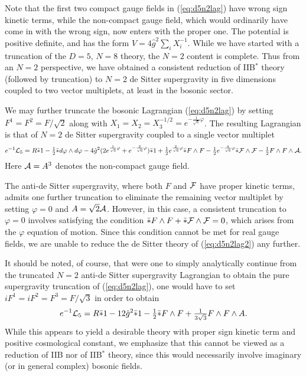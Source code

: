 \documentclass[a4paper,12pt]{article}
\newcommand{\fft}[2]{{\frac{#1}{#2}}}
\newcommand{\ft}[2]{{\textstyle\frac{#1}{#2}}}
\begin{document}
Note that the first two compact gauge fields in
(\ref{eq:d5n2lag}) have wrong sign kinetic terms, while the non-compact
gauge field, which would ordinarily have come in with the wrong sign,
now enters with the proper one.  The potential is positive definite,
and has the form $V=4\hat g^2 \sum_i{X_i^{-1}}$.  While we have
started with a truncation of the $D=5$, $N=8$ theory, the $N=2$ content
is complete.  Thus from an $N=2$ perspective, we have obtained a
consistent reduction of IIB$^*$ theory (followed by truncation) to
$N=2$ de Sitter supergravity in five dimensions coupled to two vector
multiplets, at least in the bosonic sector.

We may further truncate the bosonic Lagrangian (\ref{eq:d5n2lag}) by
setting $F^1=F^2=F/\sqrt{2}$ along with
$X_1=X_2=X_3^{-1/2}=e^{-\fft1{\sqrt{6}}\varphi}$.  The resulting
Lagrangian is that of $N=2$ de Sitter supergravity coupled to a single
vector multiplet
%
\begin{equation}
e^{-1}{\cal L}_5 = R\bar *1-\ft12\bar*d\varphi\wedge d\varphi
-4\hat g^2(2e^{\fft1{\sqrt{6}}\varphi}+e^{-\fft2{\sqrt{6}}\varphi})\bar*1
+\ft12e^{\fft2{\sqrt{6}}\varphi}\bar*F\wedge
F-\ft12e^{-\fft4{\sqrt{6}}\varphi}
\bar*{\cal F}\wedge{\cal F}-\ft12F\wedge F\wedge{\cal A}.
\label{eq:d5n2lag2}
\end{equation}
%
Here ${\cal A}=A^3$ denotes the non-compact gauge field.

The anti-de Sitter supergravity, where both $F$ and ${\cal F}$ have
proper kinetic terms, admits one further truncation to eliminate the
remaining vector multiplet by setting $\varphi=0$ and $A=\sqrt{2}{\cal
A}$.  However, in this case, a consistent truncation to $\varphi=0$
involves satisfying the condition $\bar*F\wedge F+\bar*{\cal F}\wedge
{\cal F}=0$, which arises from the $\varphi$ equation of motion.  Since
this condition cannot be met for real gauge fields, we are unable to
reduce the de Sitter theory of (\ref{eq:d5n2lag2}) any further.

It should be noted, of course, that were one to simply analytically
continue from the truncated $N=2$ anti-de Sitter supergravity Lagrangian
to obtain the pure supergravity truncation of (\ref{eq:d5n2lag}), one
would have to set $iF^1=iF^2=F^3=F/\sqrt{3}$ in order to obtain 
%
\begin{equation}
e^{-1}{\cal L}_5=R\bar*1-12\hat g^2\bar*1
-\ft12\bar*F\wedge F+\ft1{3\sqrt{3}}F\wedge F\wedge A.
\end{equation}
%
While this appears to yield a desirable theory with proper sign kinetic
term and positive cosmological constant, we emphasize that this cannot
be viewed as a reduction of IIB nor of IIB$^*$ theory, since this would
necessarily involve imaginary (or in general complex) bosonic fields.
\end{document}
